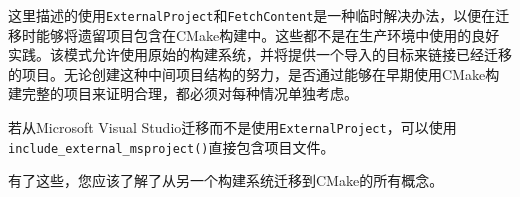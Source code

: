 \begin{tcolorbox}[colback=blue!5!white,colframe=blue!75!black,title=临时的解决方案]
这里描述的使用\texttt{ExternalProject}和\texttt{FetchContent}是一种临时解决办法，以便在迁移时能够将遗留项目包含在CMake构建中。这些都不是在生产环境中使用的良好实践。该模式允许使用原始的构建系统，并将提供一个导入的目标来链接已经迁移的项目。无论创建这种中间项目结构的努力，是否通过能够在早期使用CMake构建完整的项目来证明合理，都必须对每种情况单独考虑。

若从Microsoft Visual Studio迁移而不是使用\texttt{ExternalProject}，可以使用\texttt{include\_external\_msproject()}直接包含项目文件。
\end{tcolorbox}

有了这些，您应该了解了从另一个构建系统迁移到CMake的所有概念。


























